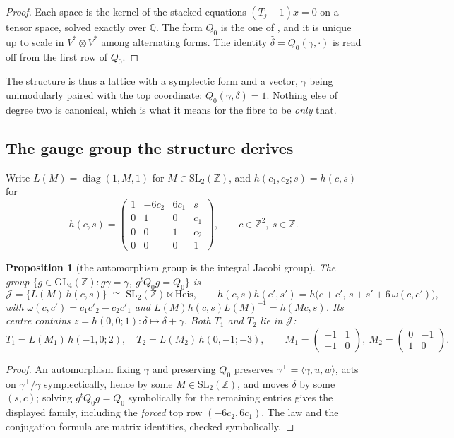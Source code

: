 \documentclass[11pt,a4paper]{article}
\newcommand{\ZZ}{\mathbb{Z}}
\newcommand{\QQ}{\mathbb{Q}}
\newcommand{\SL}{\mathrm{SL}}
\newcommand{\GL}{\mathrm{GL}}
\theoremstyle{plain}
\newtheorem{proposition}{Proposition}
\theoremstyle{definition}
\begin{document}
\begin{proof}
Each space is the kernel of the stacked equations $(T_j-1)x=0$ on a tensor space, solved
exactly over $\QQ$. The form $Q_0$ is the one of \cite[Lemma~2.8]{Alpoge}, and it is
unique up to scale in $V^*\otimes V^*$ among alternating forms. The identity
$\hat\delta=Q_0(\gamma,\cdot)$ is read off from the first row of $Q_0$.
\end{proof}

The structure is thus a lattice with a symplectic form and a vector, $\gamma$ being
unimodularly paired with the top coordinate: $Q_0(\gamma,\delta)=1$. Nothing else of
degree two is canonical, which is what it means for the fibre to be \emph{only} that.

\subsection{The gauge group the structure derives}

Write $L(M)=\operatorname{diag}(1,M,1)$ for $M\in\SL_2(\ZZ)$, and $h(c_1,c_2;s)=h(c,s)$ for
\[
  h(c,s)=\begin{pmatrix}1&-6c_2&6c_1&s\\0&1&0&c_1\\0&0&1&c_2\\0&0&0&1\end{pmatrix},
  \qquad c\in\ZZ^2,\ s\in\ZZ .
\]

\begin{proposition}[the automorphism group is the integral Jacobi group]
\label{prop:gauge-group}
The group $\{g\in\GL_4(\ZZ):g\gamma=\gamma,\ g^{t}Q_0g=Q_0\}$ is
\[
  \mathcal J=\{L(M)\,h(c,s)\}\;\cong\;\SL_2(\ZZ)\ltimes\mathrm{Heis},\qquad
  h(c,s)h(c',s')=h\bigl(c+c',\,s+s'+6\,\omega(c,c')\bigr),
\]
with $\omega(c,c')=c_1c'_2-c_2c'_1$ and $L(M)h(c,s)L(M)^{-1}=h(Mc,s)$. Its centre
contains $z=h(0,0;1)\colon\delta\mapsto\delta+\gamma$. Both $T_1$ and $T_2$ lie in
$\mathcal J$:
\[
  T_1=L(M_1)\,h(-1,0;2),\quad T_2=L(M_2)\,h(0,-1;-3),\qquad
  M_1=\begin{pmatrix}-1&1\\-1&0\end{pmatrix},\ 
  M_2=\begin{pmatrix}0&-1\\1&0\end{pmatrix}.
\]
\end{proposition}

\begin{proof}
An automorphism fixing $\gamma$ and preserving $Q_0$ preserves $\gamma^\perp=\langle\gamma,u,w\rangle$,
acts on $\gamma^\perp/\gamma$ symplectically, hence by some $M\in\SL_2(\ZZ)$, and moves
$\delta$ by some $(s,c)$; solving $g^tQ_0g=Q_0$ symbolically for the remaining entries gives
the displayed family, including the \emph{forced} top row $(-6c_2,6c_1)$. The law and the conjugation formula are matrix
identities, checked symbolically.
\end{proof}
\end{document}
